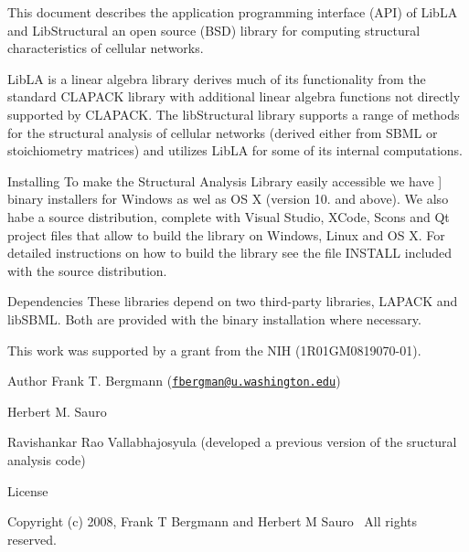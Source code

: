 \begin{DoxyParagraph}{}
This document describes the application programming interface (A\+PI) of Lib\+LA and Lib\+Structural an open source (B\+SD) library for computing structural characteristics of cellular networks. 
\end{DoxyParagraph}
\begin{DoxyParagraph}{}
Lib\+LA is a linear algebra library derives much of its functionality from the standard C\+L\+A\+P\+A\+CK library with additional linear algebra functions not directly supported by C\+L\+A\+P\+A\+CK. The lib\+Structural library supports a range of methods for the structural analysis of cellular networks (derived either from S\+B\+ML or stoichiometry matrices) and utilizes Lib\+LA for some of its internal computations. 
\end{DoxyParagraph}
\begin{DoxyParagraph}{Installing}
To make the Structural Analysis Library easily accessible we have \mbox{]} binary installers for Windows as wel as OS X (version 10. and above). We also habe a source distribution, complete with Visual Studio, X\+Code, Scons and Qt project files that allow to build the library on Windows, Linux and OS X. For detailed instructions on how to build the library see the file I\+N\+S\+T\+A\+LL included with the source distribution. 
\end{DoxyParagraph}
\begin{DoxyParagraph}{Dependencies}
These libraries depend on two third-\/party libraries, L\+A\+P\+A\+CK and lib\+S\+B\+ML. Both are provided with the binary installation where necessary. 
\end{DoxyParagraph}
\begin{DoxyParagraph}{}
This work was supported by a grant from the N\+IH (1\+R01\+G\+M0819070-\/01).
\end{DoxyParagraph}
\begin{DoxyAuthor}{Author}
Frank T. Bergmann (\href{mailto:fbergman@u.washington.edu}{\tt fbergman@u.\+washington.\+edu}) 

Herbert M. Sauro 

Ravishankar Rao Vallabhajosyula (developed a previous version of the sructural analysis code)
\end{DoxyAuthor}
\begin{DoxyParagraph}{License}

\end{DoxyParagraph}
\begin{DoxyParagraph}{}
Copyright (c) 2008, Frank T Bergmann and Herbert M Sauro~\newline
All rights reserved.
\end{DoxyParagraph}
